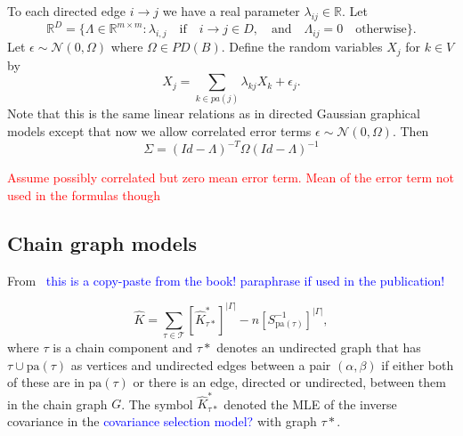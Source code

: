\documentclass[10pt,a4paper]{article}
\begin{document}
To each directed edge $i \rightarrow j$ we have a real parameter $\lambda_{ij}\in \mathbb{R}$. Let
\[\mathbb{R}^D=\{\Lambda \in \mathbb{R}^{m\times m}:\lambda_{i,j} \quad \text{if} \quad i \rightarrow j \in D, \quad \text{and} \quad \Lambda_{ij}=0 \quad \text{otherwise}\}.\]
Let $\epsilon \sim \mathcal{N}(0, \Omega)$ where $\Omega \in PD(B)$. Define the random variables $X_j$ for
$k \in V$ by
\[X_j=\sum\limits_{k \in pa(j)}\lambda_{kj}X_k+\epsilon_j.\]
Note that this is the same linear relations as in directed Gaussian graphical models except that now we allow correlated error terms $\epsilon \sim \mathcal{N}(0, \Omega)$. Then
\begin{equation}
\Sigma=(Id-\Lambda)^{-T}\Omega(Id-\Lambda)^{-1}
\end{equation}

\textcolor{red}{Assume possibly correlated but zero mean error term. Mean of the error term not used in the formulas though}
\subsection{Chain graph models}
From~\cite[Section 5.4.1]{lauritzen1996graphical} \textcolor{blue}{this is a copy-paste from the book! paraphrase if used in the publication!}

\begin{equation}
\hat{K}=\sum\limits_{\tau \in \mathcal{T}}[\hat{K}^*_{\tau*}]^{|\Gamma|}-n[S_{\text{pa}(\tau)}^{-1}]^{|\Gamma|},
\end{equation}
where $\tau$ is a chain component and $\tau*$ denotes an undirected graph that has $\tau \cup \text{pa}(\tau)$ as vertices and undirected edges between a pair $(\alpha,\beta)$ if either both of these are in $\text{pa}(\tau)$ or there is an edge, directed or undirected, between them in the chain graph $G$. The symbol $\hat{K}^*_{\tau*}$ denoted the MLE of the inverse covariance in the \textcolor{blue}{covariance selection model?} with graph $\tau*$.  


\end{document}
